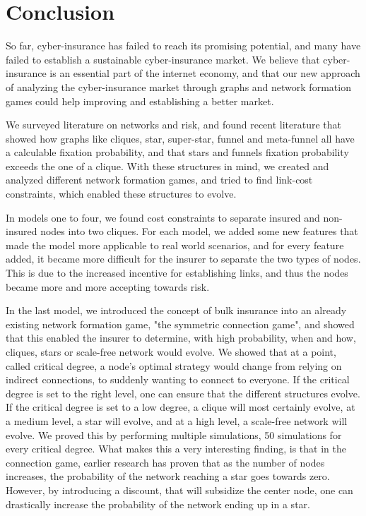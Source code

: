 \section{Conclusion}

So far, cyber-insurance has failed to reach its promising potential, and many have failed to establish a sustainable cyber-insurance market. We believe that cyber-insurance is an essential part of the internet economy, and that our new approach of analyzing the cyber-insurance market through graphs and network formation games could help improving and establishing a better market.  

We surveyed literature on networks and risk, and found recent literature that showed how graphs like cliques, star, super-star, funnel and meta-funnel all have a calculable fixation probability, and that stars and funnels fixation probability exceeds the one of a clique. 
With these structures in mind, we created and analyzed different network formation games, and tried to find link-cost constraints, which enabled these structures to evolve.

In models one to four, we found cost constraints to separate insured and non-insured nodes into two cliques. 
For each model, we added some new features that made the model more applicable to real world scenarios, and for every feature added, it became more difficult for the insurer to separate the two types of nodes. This is due to the increased incentive for establishing links, and thus the nodes became more and more accepting towards risk. 


In the last model, we introduced the concept of bulk insurance into an already existing network formation game, "the symmetric connection game", and showed that this enabled the insurer to determine, with high probability, when and how, cliques, stars or scale-free network would evolve. We showed that at a point, called critical degree, a node's optimal strategy would change from relying on indirect connections, to suddenly wanting to connect to everyone. If the critical degree is set to the right level, one can ensure that the different structures evolve. If the critical degree is set to a low degree, a clique will most certainly evolve, at a medium level, a star will evolve, and at a high level, a scale-free network will evolve. We proved this by performing multiple simulations, 50 simulations for every critical degree.  
What makes this a very interesting finding, is that in the connection game, earlier research has proven that as the number of nodes increases, the probability of the network reaching a star goes towards zero. However, by introducing a discount, that will subsidize the center node, one can drastically increase the probability of the network ending up in a star.

